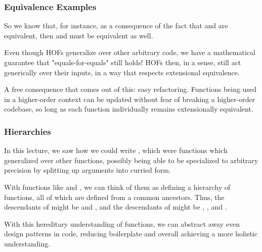 \documentclass[aspectratio=169]{beamer}
\begin{document}
\begin{frame}[fragile]
  \frametitle{Equivalence Examples}

  So we know that, for instance, as a consequence of the fact that 
  and  are equivalent, then  and
   must be equivalent as well.

  \pause
  \vspace{\fill}

  Even though HOFs generalize over other arbitrary code, we have a mathematical guarantee
  that "equals-for-equals" still holds! HOFs then, in a sense, still act generically over
  their inputs, in a way that respects extensional equivalence.

  \pause
  \vspace{\fill}

  A free consequence that comes out of this: easy refactoring. Functions being
  used in a higher-order context can be updated without fear of breaking a
  higher-order codebase, so long as each function individually remains
  extensionally equivalent.\footnotemark

\end{frame}

\begin{frame}[fragile]
  \frametitle{Hierarchies}

  In this lecture, we saw how we could write , which were
  functions which generalized over other functions, possibly being able to be specialized
  to arbitrary precision by splitting up arguments into curried form.

  \pause
  \vspace{\fill}

  With functions like  and , we can think of them as defining
  a hierarchy of functions, all of which are defined from a common ancestors. Thus, the
  descendants of  might be  and ,
  and the descendants of  might be , , and .

  \pause
  \vspace{\fill}

  With this hereditary understanding of functions, we can abstract away even design patterns
  in code, reducing boilerplate and overall achieving a more holistic understanding.
\end{frame}
\end{document}
